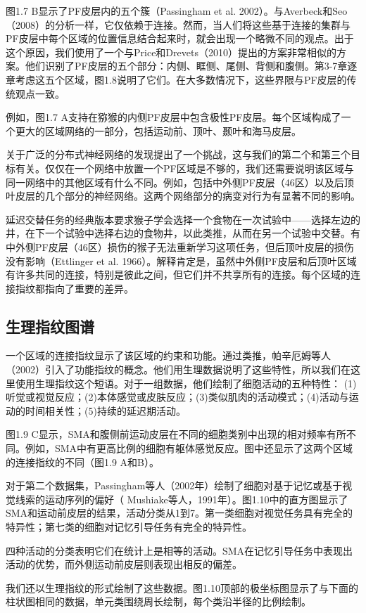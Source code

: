 \par
图1.7 B显示了PF皮层内的五个簇（Passingham et al. 2002）。与Averbeck和Seo（2008）的分析一样，它仅依赖于连接。然而，当人们将这些基于连接的集群与PF皮层中每个区域的位置信息结合起来时，就会出现一个略微不同的观点。出于这个原因，我们使用了一个与Price和Drevets（2010）提出的方案非常相似的方案。他们识别了PF皮层的五个部分：内侧、眶侧、尾侧、背侧和腹侧。第3-7章逐章考虑这五个区域，图1.8说明了它们。在大多数情况下，这些界限与PF皮层的传统观点一致。
\par
例如，图1.7 A支持在猕猴的内侧PF皮层中包含极性PF皮层。每个区域构成了一个更大的区域网络的一部分，包括运动前、顶叶、颞叶和海马皮层。
\par
关于广泛的分布式神经网络的发现提出了一个挑战，这与我们的第二个和第三个目标有关。仅仅在一个网络中放置一个PF区域是不够的，我们还需要说明该区域与同一网络中的其他区域有什么不同。例如，包括中外侧PF皮层（46区）以及后顶叶皮层的几个部分的神经网络。这两个网络部分的病变对行为有显著不同的影响。
\par
延迟交替任务的经典版本要求猴子学会选择一个食物在一次试验中——选择左边的井，在下一个试验中选择右边的食物井，以此类推，从而在另一个试验中交替。有中外侧PF皮层（46区）损伤的猴子无法重新学习这项任务，但后顶叶皮层的损伤没有影响（Ettlinger et al. 1966）。解释肯定是，虽然中外侧PF皮层和后顶叶区域有许多共同的连接，特别是彼此之间，但它们并不共享所有的连接。每个区域的连接指纹都指向了重要的差异。
\subsection{生理指纹图谱}
一个区域的连接指纹显示了该区域的约束和功能。通过类推，帕辛厄姆等人（2002）引入了功能指纹的概念。他们用生理数据说明了这些特性，所以我们在这里使用生理指纹这个短语。对于一组数据，他们绘制了细胞活动的五种特性： (1)听觉或视觉反应；(2)本体感觉或皮肤反应；(3)类似肌肉的活动模式；(4)活动与运动的时间相关性；(5)持续的延迟期活动。
\par
图1.9 C显示，SMA和腹侧前运动皮层在不同的细胞类别中出现的相对频率有所不同。例如，SMA中有更高比例的细胞有躯体感觉反应。图中还显示了这两个区域的连接指纹的不同（图1.9 A和B）。
\par
对于第二个数据集，Passingham等人（2002年）绘制了细胞对基于记忆或基于视觉线索的运动序列的偏好（ Mushiake等人，1991年）。图1.10中的直方图显示了SMA和运动前皮层的结果，活动分类从1到7。第一类细胞对视觉任务具有完全的特异性；第七类的细胞对记忆引导任务有完全的特异性。
\par
四种活动的分类表明它们在统计上是相等的活动。SMA在记忆引导任务中表现出活动的优势，而外侧运动前皮层则表现出相反的偏差。
\par
我们还以生理指纹的形式绘制了这些数据。图1.10顶部的极坐标图显示了与下面的柱状图相同的数据，单元类围绕周长绘制，每个类沿半径的比例绘制。


